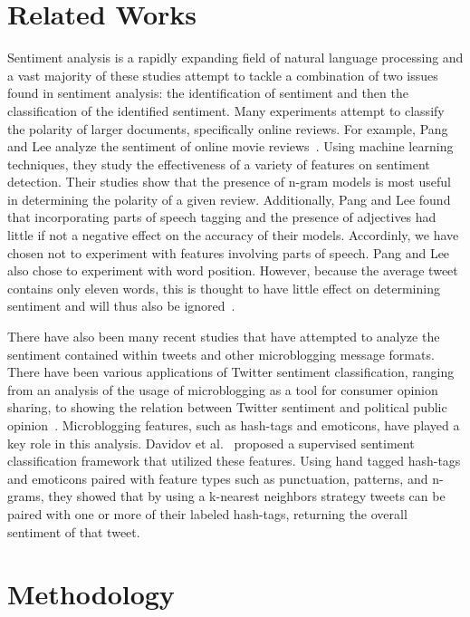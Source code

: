 \documentclass[11pt]{article}
\begin{document}
\section{Related Works}
Sentiment analysis is a rapidly expanding field of natural language processing and a vast majority of these studies attempt to tackle a combination of two issues found in sentiment analysis: the identification of sentiment and then the classification of the identified sentiment.  Many experiments attempt to classify the polarity of larger documents, specifically online reviews. For example, Pang and Lee analyze the sentiment of online movie reviews~\cite{pang2002thumbs}. Using machine learning techniques, they study the effectiveness of a variety of features on sentiment detection. Their studies show that the presence of n-gram models is most useful in determining the polarity of a given review. Additionally, Pang and Lee found that incorporating parts of speech tagging and the presence of adjectives had little  if not a negative effect on the accuracy of their models. Accordinly, we have chosen not to experiment with features involving parts of speech. Pang and Lee also chose to experiment with word position. However, because the average tweet contains only eleven words, this is thought to have little effect on determining sentiment and will thus also be ignored~\cite{oconnor2010tweets}.

There have also been many recent studies that have attempted to analyze the sentiment contained within tweets and other microblogging message formats. There have been various applications of Twitter sentiment classification, ranging from an analysis of the usage of microblogging as a tool for consumer opinion sharing, to showing the relation between Twitter sentiment and political public opinion~\cite{jansen2009twitter,oconnor2010tweets}. Microblogging features, such as hash-tags and emoticons, have played a key role in this analysis. Davidov et al.~ proposed a supervised sentiment classification framework that utilized these features. Using hand tagged hash-tags and emoticons paired with feature types such as punctuation, patterns, and n-grams, they showed that by using a k-nearest neighbors strategy tweets can be paired with one or more of their labeled hash-tags, returning the overall sentiment of that tweet. 
\section{Methodology}
\end{document}

